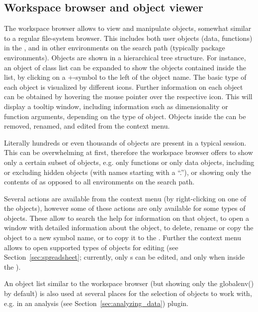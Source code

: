 \subsection{Workspace browser and object viewer}
\label{sec:workspace_browser_object_viewer}

The workspace browser allows to view
and manipulate  objects, somewhat similar
to a regular file-system browser. This includes both user objects
(data, functions) in the , and in other environments on the
 search path (typically
 package environments). Objects are shown
in a hierarchical tree structure. For instance, an object of class
list can be expanded to show the objects
contained inside the list, by clicking on a
+-symbol to the left of the object name.
The basic type of each object is visualized by different icons. Further
information on each object can be obtained by hovering the mouse
pointer over the respective icon. This will display a tooltip window,
including information such as dimensionality or function arguments,
depending on the type of object. Objects inside the  can be
removed, renamed, and edited from the context menu.

Literally hundreds or even thousands of objects are present in a typical
 session. This can be overwhelming at
first, therefore the workspace browser offers to show only a certain
subset of objects, e.g. only functions or only data objects, including
or excluding hidden objects (with names
starting with a 
``.''), or showing only the contents of  as
opposed to all environments on the search path.

Several actions are available from the context menu (by right-clicking
on one of the objects), however some of these actions are only
available for some types of objects. These allow to search the
 help for information on that object, to
open a window with detailed information about the object, to delete, rename or copy the object to a new symbol name, or to
copy it to the . Further the context menu allows to open
supported types of objects for editing (see Section~\ref{sec:spreadsheet}; currently, only
s can be edited, and only when inside the ). 

An object list similar to the workspace browser (but showing only the
globalenv() by default) is also used at several places for the
selection of objects to work with, e.g. in an analysis (see Section~\ref{sec:analyzing_data})
plugin.

